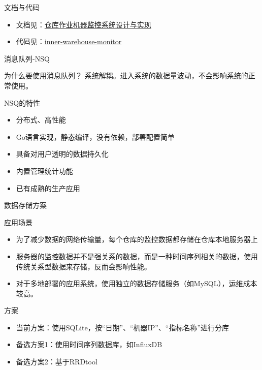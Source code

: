 \documentclass[CJK]{beamer}
\begin{document}
\begin{CJK*}{UTF8}{gbsn}
\begin{frame}{文档与代码}
\begin{itemize}
\item 文档见：\href{http://youngsterxyf.github.io/2013/11/29/inner_warehouse_monitor_system/}{仓库作业机器监控系统设计与实现}
\item 代码见：\href{http://10.24.178.60:8000/inner-warehouse-monitor}{inner-warehouse-monitor}
\end{itemize}
\end{frame}

\begin{frame}{消息队列-NSQ}
\begin{block}{为什么要使用消息队列？}
系统解耦。进入系统的数据量波动，不会影响系统的正常使用。
\end{block}
\begin{block}{NSQ的特性}
\begin{itemize}
\item 分布式、高性能
\item Go语言实现，静态编译，没有依赖，部署配置简单
\item 具备对用户透明的数据持久化
\item 内置管理统计功能
\item 已有成熟的生产应用
\end{itemize}
\end{block}
\end{frame}

\begin{frame}{数据存储方案}
\begin{block}{应用场景}
\begin{itemize}
\item 为了减少数据的网络传输量，每个仓库的监控数据都存储在仓库本地服务器上
\item 服务器的监控数据并不是强关系的数据，而是一种时间序列相关的数据，使用传统关系型数据来存储，反而会影响性能。
\item 对于多地部署的应用系统，使用独立的数据存储服务（如MySQL），运维成本较高。
\end{itemize}
\end{block}
\begin{block}{方案}
\begin{itemize}
\item 当前方案：使用SQLite，按“日期”、“机器IP”、“指标名称”进行分库
\item 备选方案1：使用时间序列数据库，如InfluxDB
\item 备选方案2：基于RRDtool
\end{itemize}
\end{block}
\end{frame}


\end{CJK*}
\end{document}
